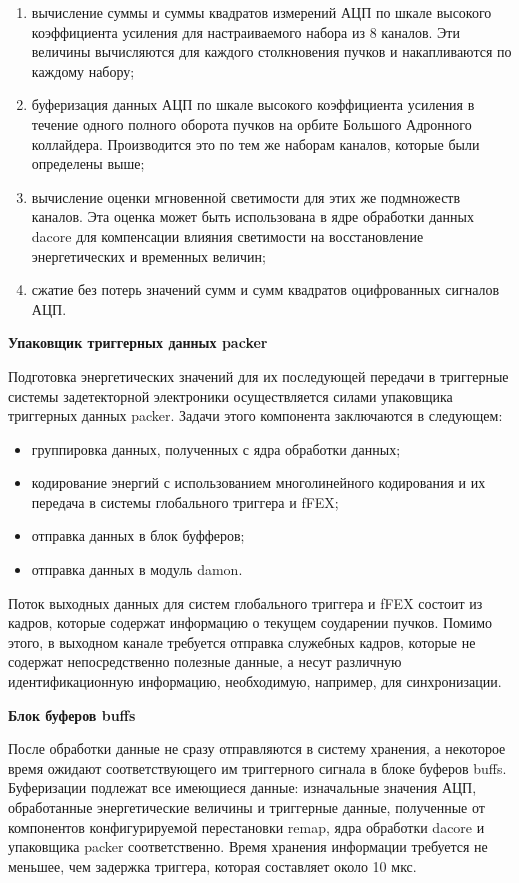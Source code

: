 \begin{enumerate}
    \item вычисление суммы и суммы квадратов измерений АЦП по шкале высокого коэффициента усиления для настраиваемого набора из 8 каналов. Эти величины вычисляются для каждого столкновения пучков и накапливаются по каждому набору;
    \item буферизация данных АЦП по шкале высокого коэффициента усиления в течение одного полного оборота пучков на орбите Большого Адронного коллайдера. Производится это по тем же наборам каналов, которые были определены выше;
    \item вычисление оценки мгновенной светимости для этих же подмножеств каналов. Эта оценка может быть использована в ядре обработки данных dacore для компенсации влияния светимости на восстановление энергетических и временных величин;
    \item сжатие без потерь значений сумм и сумм квадратов оцифрованных сигналов АЦП.
\end{enumerate}\par
\textbf{Упаковщик триггерных данных packer}\par
Подготовка энергетических значений для их последующей передачи в триггерные системы задетекторной электроники осуществляется силами упаковщика триггерных данных packer. Задачи этого компонента заключаются в следующем:\par
\begin{itemize}
    \item группировка данных, полученных с ядра обработки данных;
    \item кодирование энергий с использованием многолинейного кодирования и их передача в системы глобального триггера и fFEX;
    \item отправка данных в блок буфферов;
    \item отправка данных в модуль damon.
\end{itemize}\par
Поток выходных данных для систем глобального триггера и fFEX состоит из кадров, которые содержат информацию о текущем соударении пучков. Помимо этого, в выходном канале требуется отправка служебных кадров, которые не содержат непосредственно полезные данные, а несут различную идентификационную информацию, необходимую, например, для синхронизации.\par
\textbf{Блок буферов buffs}\par
После обработки данные не сразу отправляются в систему хранения, а некоторое время ожидают соответствующего им триггерного сигнала в блоке буферов buffs. Буферизации подлежат все имеющиеся данные: изначальные значения АЦП, обработанные энергетические величины и триггерные данные, полученные от компонентов конфигурируемой перестановки remap, ядра обработки dacore и упаковщика packer соответственно. Время хранения информации требуется не меньшее, чем задержка триггера, которая составляет около 10 мкс.\par
